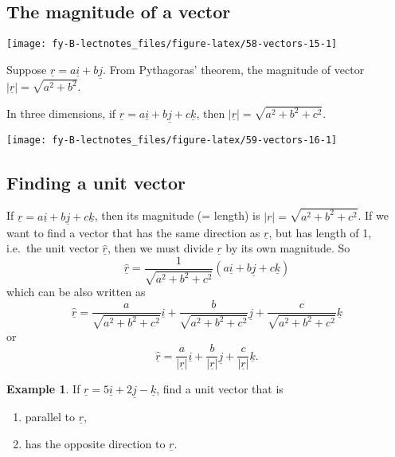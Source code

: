\documentclass[
  11pt,
  oneside]{book}
\providecommand{\tightlist}{%
  \setlength{\itemsep}{0pt}\setlength{\parskip}{0pt}}
\newcommand{\slide}{}
\theoremstyle{definition}
\theoremstyle{definition}
\newtheorem{example}{Example}[chapter]
\theoremstyle{definition}
\theoremstyle{definition}
\theoremstyle{remark}
\begin{document}
\slide

\subsection{The magnitude of a vector}\label{the-magnitude-of-a-vector}

\begin{center}\texttt{[image: fy-B-lectnotes\_files/figure-latex/58-vectors-15-1]} \end{center}

Suppose \(\underline r = a\underline i + b\underline j\). From Pythagoras' theorem, the magnitude of vector \(|\underline r| = \sqrt{a^2+b^2}\).

\slide

In three dimensions, if \(\underline r = a\underline i + b\underline j + c\underline k\), then \(|\underline r| = \sqrt{a^2+b^2+c^2}\).

\begin{center}\texttt{[image: fy-B-lectnotes\_files/figure-latex/59-vectors-16-1]} \end{center}

\slide

\subsection{Finding a unit vector}\label{finding-a-unit-vector}

If \(\underline r = a\underline i + b\underline j + c\underline k\), then its magnitude (= length) is \(|r| = \sqrt{a^2+b^2+c^2}\). If we want to find a vector that has the same direction as \(\underline r\), but has length of 1, i.e.~the unit vector \(\underline{\hat r}\), then we must divide \(\underline r\) by its own magnitude. So
\[
\underline{\hat r} = \frac{1}{\sqrt{a^2+b^2+c^2}}(a\underline i+b\underline j+c\underline k)
\]
which can be also written as
\[
\underline{\hat r} = \frac{a}{\sqrt{a^2+b^2+c^2}}\underline i+\frac{b}{\sqrt{a^2+b^2+c^2}}\underline j+\frac{c}{\sqrt{a^2+b^2+c^2}}\underline k
\]
or
\[
\underline{\hat r} = \frac{a}{|\underline r|}\underline i+\frac{b}{|\underline r|}\underline j+\frac{c}{|\underline r|}\underline k.
\]
\slide

\begin{example}

If \(\underline r = 5\underline i+2\underline j-\underline k\), find a unit vector that is

\begin{enumerate}
\def\labelenumi{\alph{enumi}.}
\tightlist
\item
  parallel to \(\underline r\),
\item
  has the opposite direction to \(\underline r\).
\end{enumerate}

\end{example}
\end{document}
